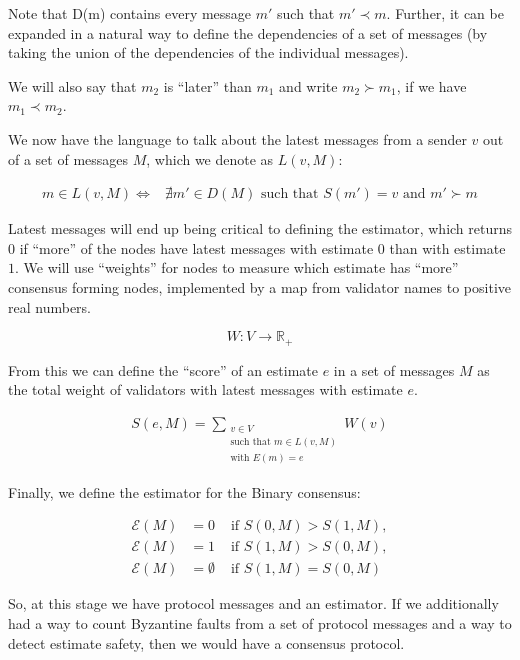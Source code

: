 \documentclass{article}
\theoremstyle{definition}
\begin{document}
Note that D(m) contains every message $m'$ such that $m' \prec m$. Further, it can be expanded in a natural way to define the dependencies of a set of messages (by taking the union of the dependencies of the individual messages).

We will also say that $m_2$ is ``later'' than $m_1$ and write $m_2 \succ m_1$, if we have $m_1 \prec m_2$.

We now have the language to talk about the latest messages from a sender $v$ out of a set of messages $M$, which we denote as $L(v, M)$:

\begin{equation}
\begin{split}
m \in L(v, M) \iff & \nexists m' \in D(M) \text{ such that } S(m') = v \text{ and } m' \succ m
\end{split}
\end{equation}

Latest messages will end up being critical to defining the estimator, which returns $0$ if ``more'' of the nodes have latest messages with estimate $0$ than with estimate $1$. We will use ``weights'' for nodes to measure which estimate has ``more'' consensus forming nodes, implemented by a map from validator names to positive real numbers.

$$
W:V \to \mathbb{R}_+
$$

From this we can define the ``score'' of an estimate $e$ in a set of messages $M$ as the total weight of validators with latest messages with estimate $e$.

\begin{align}
S(e, M) = \sum_{\substack{v \in V \\ \text{such that } m \in L(v,M) \\ \text{with } E(m) = e}} W(v)
\end{align}

Finally, we define the estimator for the Binary consensus:
	
\begin{align}
	\mathcal{E}(M) &= 0 &\text{ if } S(0, M) > S(1, M), \\
	\mathcal{E}(M) &= 1 &\text{ if } S(1, M) > S(0, M), \\
	\mathcal{E}(M) &= \emptyset &\text{ if } S(1, M) = S(0, M)
\end{align}

So, at this stage we have protocol messages and an estimator. If we additionally had a way to count Byzantine faults from a set of protocol messages and a way to detect estimate safety, then we would have a consensus protocol.
\end{document}
